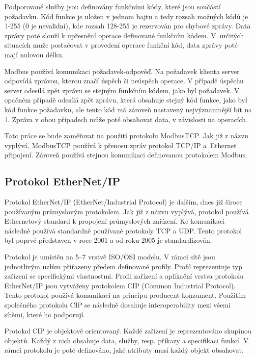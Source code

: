 Podporované služby jsou definovány funkčními kódy, které jsou součástí požadavku. Kód funkce je uložen v jednom bajtu a tedy rozsah možných kódů je 1-255 (0 je nevalidní), kde rozsah 128-255 je rezervován pro chybové zprávy. Data zprávy poté slouží k upřesnění operace definované funkčním kódem. V~určitých situacích muže postačovat v provedení operace funkční kód, data zprávy poté mají nulovou délku.

Modbus používá komunikaci požadavek-odpověď. Na požadavek klienta server odpovídá zprávou, kterou značí úspěch či neúspěch operace. V případě úspěchu server odesílá zpět zprávu se stejným funkčním kódem, jako byl požadavek. V opačném případě odesílá zpět zprávu, která obsahuje stejný kód funkce, jako byl kód funkce požadavku, ale tento kód má zároveň nastavený nejvýznamnější bit na 1. Zpráva v obou případech může poté obsahovat data, v závislosti na operacích. \cite{modbus}

Tato práce se bude zaměřovat na použití protokolu ModbusTCP. Jak již z názvu vyplývá, ModbusTCP používá k přenosu zpráv protokol TCP/IP a~Ethernet připojení. Zároveň používá stejnou komunikaci definovanou protokolem Modbus.

\subsection{Protokol EtherNet/IP}
Protokol EtherNet/IP (EtherNet/Industrial Protocol) je dalším, dnes již široce používaným průmyslovým protokolem. Jak již z názvu vyplývá, protokol používá Ethernetový standard k propojení průmyslových zařízení. Ke komunikaci následně používá standardně používané protokoly TCP a UDP. Tento protokol byl poprvé představen v roce 2001 a od roku 2005 je standardizován. 

Protokol je umístěn na 5--7 vrstvě ISO/OSI modelu. V rámci sítě jsou jednotlivým uzlům přiřazeny předem definované profily. Profil reprezentuje typ zařízení se specifickými vlastnostmi. Profil zařízení a aplikační vrstva protokolu EtherNet/IP jsou vytvářeny protokolem CIP (Common Industrial Protocol). Tento protokol používá komunikaci na principu producent-konzument. Použitím společného protokolu CIP se následně dosahuje interoperability mezi všemi sítěmi, které ho podporují. 

Protokol CIP je objektově orientovaný. Každé zařízení je reprezentováno skupinou objektů. Každý z nich obsahuje data, služby, resp. příkazy a specifikaci funkcí. V rámci protokolu je poté definováno, jaké atributy musí každý objekt obsahovat.

